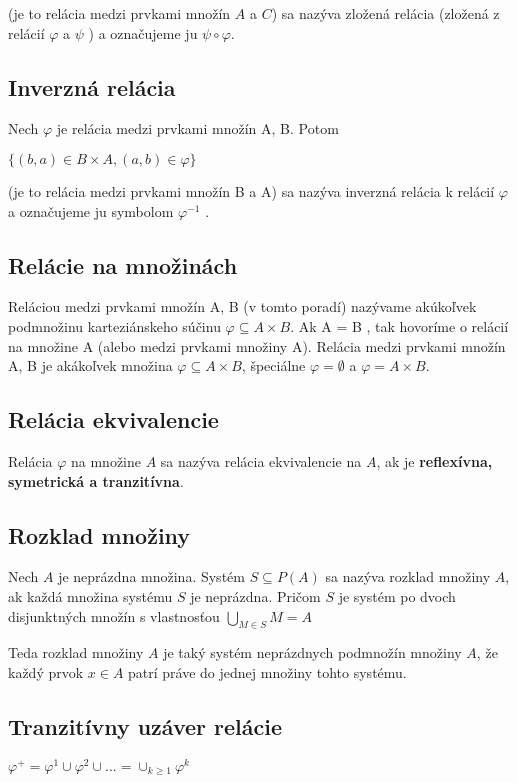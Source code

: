 		(je to relácia medzi prvkami množín $A$ a $C$) sa nazýva zložená relácia (zložená z relácií $\varphi$ a $\psi$ ) a označujeme ju $\psi \circ  \varphi$.

 	\subsection*{Inverzná relácia}

		Nech $\varphi$ je relácia medzi prvkami množín A, B. Potom

		$\{( b, a ) \in B \times A, ( a, b ) \in \varphi \} $

		(je to relácia medzi prvkami množín B a A) sa nazýva inverzná relácia k relácií $\varphi$ a označujeme ju symbolom $\varphi^{-1}$ .

	\subsection*{Relácie na množinách} 
		Reláciou medzi prvkami množín A, B (v tomto poradí) nazývame akúkoľvek podmnožinu karteziánskeho súčinu $\varphi \subseteq A \times B$. Ak A = B , tak hovoríme o relácií na množine A (alebo medzi prvkami množiny A). Relácia medzi prvkami množín A, B je akákoľvek množina $\varphi \subseteq A \times B $, špeciálne $\varphi = \emptyset$ a $\varphi = A \times B$.
	\subsection*{Relácia ekvivalencie}
		Relácia $\varphi$ na množine $A$ sa nazýva relácia ekvivalencie na $A$, ak je \textbf{reflexívna, symetrická a tranzitívna}.

	\subsection*{Rozklad množiny}

		Nech $A$ je neprázdna množina. Systém $S \subseteq P (A)$ sa nazýva rozklad množiny $A$, ak každá množina systému $S$ je neprázdna. Pričom $S$ je systém po dvoch disjunktných množín s vlastnosťou $\bigcup_{M \in S} M = A$

		Teda rozklad množiny $A$ je taký systém neprázdnych podmnožín množiny $A$, že každý prvok
		$x \in A$ patrí práve do jednej množiny tohto systému.

	\subsection*{Tranzitívny uzáver relácie}
		$\varphi^{+} = \varphi^{1} \cup \varphi^{2} \cup ... = \cup_{k \geq 1} \varphi^k$

